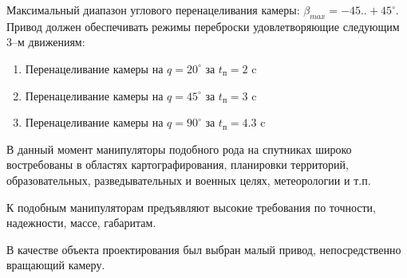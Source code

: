 Максимальный диапазон углового перенацеливания камеры: $\beta_{max} = -45..+45^{\circ}$.
Привод должен обеспечивать режимы переброски удовлетворяющие следующим 3--м движениям:

\begin{enumerate}
    \item Перенацеливание камеры на $q = 20^{\circ}$ за $t_{\textit{п}} = 2  $ c
    \item Перенацеливание камеры на $q = 45^{\circ}$ за $t_{\textit{п}} = 3  $ c
    \item Перенацеливание камеры на $q = 90^{\circ}$ за $t_{\textit{п}} = 4.3$ c
\end{enumerate}

В данный момент манипуляторы подобного рода на спутниках широко востребованы
в областях картографирования, планировки территорий, образовательных,
разведывательных и военных целях, метеорологии и т.п.

К подобным манипуляторам предъявляют высокие требования по точности,
надежности, массе, габаритам.

В качестве объекта проектирования был выбран малый привод, непосредственно вращающий камеру.

\endinput
